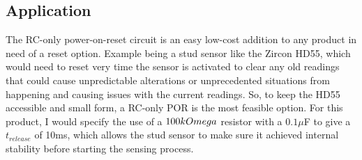 \documentclass[conference]{IEEEtran}
\begin{document}
\subsection{Application}
The RC-only power-on-reset circuit is an easy low-cost addition to any product in need of a reset option. Example being a stud sensor like the Zircon HD55, which would need to reset very time the sensor is activated to clear any old readings that could cause unpredictable alterations or unprecedented situations from happening and causing issues with the current readings. So, to keep the HD55 accessible and small form, a RC-only POR is the most feasible option. For this product, I would specify the use of a $100k\\Omega$ resistor with a $0.1\mu$F to give a $t_{release}$ of 10ms, which allows the stud sensor to make sure it achieved internal stability before starting the sensing process.
\end{document}
